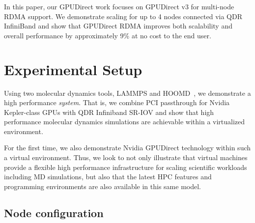 \documentclass{sigplanconf}
\begin{document}
In this paper, our GPUDirect work focuses on GPUDirect v3 for multi-node RDMA
support.  We demonstrate scaling for up to 4 nodes connected via QDR InfiniBand
and show that GPUDirect RDMA improves both scalability and overall performance
by approximately 9\% at no cost to the end user.












\section{Experimental Setup}

Using two molecular dynamics tools, LAMMPS\cite{plimpton2007lammps} and HOOMD~\cite{anderson2010hoomd}, we demonstrate a high performance \textit{system}.  That is, we combine PCI passthrough for Nvidia Kepler-class GPUs with QDR Infiniband SR-IOV and show that high performance molecular dynamics simulations are achievable within a virtualized environment. 

For the first time, we also demonstrate Nvidia GPUDirect technology within such a virtual environment.  Thus, we look to not only illustrate that virtual machines provide a flexible high performance infrastructure for scaling scientific workloads including MD simulations, but also that the latest HPC features and programming environments are also available in this same model.   

\subsection{Node configuration}
\end{document}
